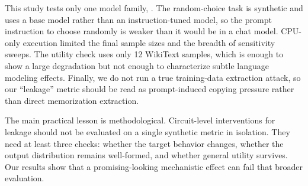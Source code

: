  This study tests only one model family, \gptsmall. The random-choice task is synthetic and uses a base model rather than an instruction-tuned model, so the prompt instruction to choose randomly is weaker than it would be in a chat model. CPU-only execution limited the final sample sizes and the breadth of sensitivity sweeps. The utility check uses only 12 WikiText samples, which is enough to show a large degradation but not enough to characterize subtle language modeling effects. Finally, we do not run a true training-data extraction attack, so our ``leakage'' metric should be read as prompt-induced copying pressure rather than direct memorization extraction.

 The main practical lesson is methodological. Circuit-level interventions for leakage should not be evaluated on a single synthetic metric in isolation. They need at least three checks: whether the target behavior changes, whether the output distribution remains well-formed, and whether general utility survives. Our results show that a promising-looking mechanistic effect can fail that broader evaluation.
